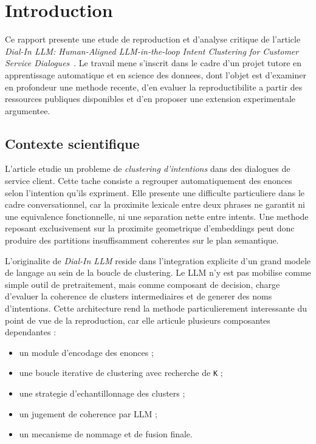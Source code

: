 \chapter{Introduction}

Ce rapport presente une etude de reproduction et d'analyse critique de
l'article \emph{Dial-In LLM: Human-Aligned LLM-in-the-loop Intent Clustering
for Customer Service Dialogues}~\cite{hong2025dialinllm}. Le travail mene
s'inscrit dans le cadre d'un projet tutore en apprentissage automatique et en
science des donnees, dont l'objet est d'examiner en profondeur une methode
recente, d'en evaluer la reproductibilite a partir des ressources publiques
disponibles et d'en proposer une extension experimentale argumentee.

\section{Contexte scientifique}

L'article etudie un probleme de \emph{clustering d'intentions} dans des
dialogues de service client. Cette tache consiste a regrouper automatiquement
des enonces selon l'intention qu'ils expriment. Elle presente une difficulte
particuliere dans le cadre conversationnel, car la proximite lexicale entre
deux phrases ne garantit ni une equivalence fonctionnelle, ni une separation
nette entre intents. Une methode reposant exclusivement sur la proximite
geometrique d'embeddings peut donc produire des partitions insuffisamment
coherentes sur le plan semantique.

L'originalite de \emph{Dial-In LLM} reside dans l'integration explicite d'un
grand modele de langage au sein de la boucle de clustering. Le LLM n'y est pas
mobilise comme simple outil de pretraitement, mais comme composant de decision,
charge d'evaluer la coherence de clusters intermediaires et de generer des noms
d'intentions. Cette architecture rend la methode particulierement interessante
du point de vue de la reproduction, car elle articule plusieurs composantes
dependantes :
\begin{itemize}[leftmargin=*]
  \item un module d'encodage des enonces ;
  \item une boucle iterative de clustering avec recherche de \texttt{K} ;
  \item une strategie d'echantillonnage des clusters ;
  \item un jugement de coherence par LLM ;
  \item un mecanisme de nommage et de fusion finale.
\end{itemize}

